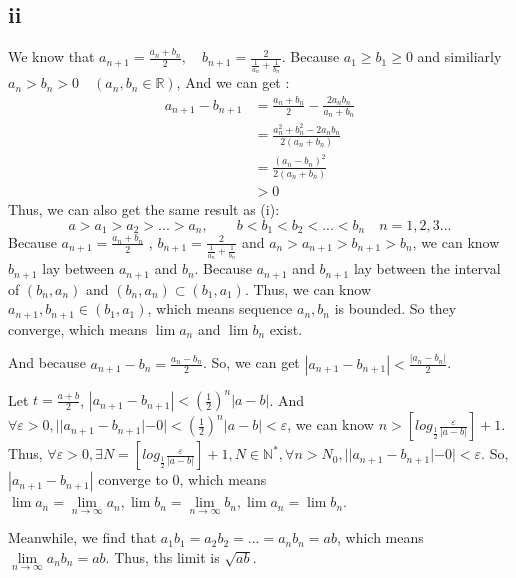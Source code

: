 \documentclass[11pt,twoside,a4paper]{article}
\begin{document}
\subsection{ii}
We know that $\displaystyle a_{n+1}=\frac{a_{n}+b_{n}}{2}, \quad b_{n+1}=\frac{2}{\frac{1}{a_{n}}+\frac{1}{b_{n}}} $. Because $a_{1}\ge b_{1}\ge 0$ and similiarly $a_{n}>b_{n}>0\quad(a_{n},b_{n}\in \mathbb{R})$,  And we can get :
\begin{align*}
a_{n+1}-b_{n+1}&=\frac{a_{n}+b_{n}}{2}-\frac{2 a_{n} b_{n}}{a_{n}+b_{n}} \\
&=\frac{a_{n}^{2}+b_{n}^{2}-2 a_{n} b_{n}}{2\left(a_{n}+b_{n}\right)} \\
&=\frac{\left(a_{n}-b_{n}\right)^{2}}{2\left(a_{n}+b_{n}\right)} \\
&>0
\end{align*}
Thus, we can also get the same result as (i):
$$a>a_{1}>a_{2}> ... >a_{n},\quad \quad b<b_{1}<b_{2}< ... <b_{n}\quad n=1,2,3...$$
Because $\displaystyle a_{n+1}=\frac{a_{n}+b_{n}}{2}$ , $\displaystyle b_{n+1}=\frac{2}{\frac{1}{a_{n}}+\frac{1}{b_{n}}} $ and  $a_{n}>a_{n+1}>b_{n+1}>b_{n}$, we can know $b_{n+1}$ lay between $a_{n+1}$ and $b_{n}$.
Because  $a_{n+1}$ and $b_{n+1}$ lay between the interval of $(b_{n},a_{n})$ and $(b_{n},a_{n}) \subset (b_{1},a_{1})$. Thus, we can know $a_{n+1},b_{n+1}\in (b_{1},a_{1})$, which means sequence $a_{n},b_{n}$ is bounded. So they converge, which means $\lim a_{n}$ and  $\lim b_{n}$ exist.
\par\noindent
 And because $\displaystyle a_{n+1}-b_{n}=\frac{a_{n}-b_{n}}{2}$. So, we can get $\displaystyle |a_{n+1}-b_{n+1}|< \frac{|a_{n}-b_{n}|}{2}$.
\par\noindent
Let $\displaystyle t=\frac{a+b}{2}$, $\displaystyle |a_{n+1}-b_{n+1}|< (\frac{1}{2})^{n}|a-b|$.  And $\displaystyle\forall\varepsilon>0,| |a_{n+1}-b_{n+1}|-0|< (\frac{1}{2})^{n}|a-b|<\varepsilon$, we can know $\displaystyle n>\left[log_{\frac{1}{2}}{\frac{\varepsilon}{|a-b|}} \right]+1$. Thus, $\displaystyle\forall\varepsilon>0,\exists N=\left[log_{\frac{1}{2}}{\frac{\varepsilon}{|a-b|}} \right]+1, N\in \mathbb{N}^*,\forall n>N_{0},| |a_{n+1}-b_{n+1}|-0|<\varepsilon$. So, $|a_{n+1}-b_{n+1}|$ converge to 0, which means $\lim a_{n}=\displaystyle\lim\limits_{n\to\infty}a_{n},\lim b_{n}=\lim\limits_{n\to\infty}b_{n},\lim a_{n}=\lim b_{n}$.
\par\noindent
Meanwhile, we find that $\displaystyle a_{1}b_{1}=a_{2}b_{2}=...=a_{n}b_{n}=ab$, which means $\displaystyle\lim\limits_{n\to\infty}a_{n}b_{n}=ab$.
Thus, ths limit is $\sqrt{ab}$.
\end{document}
